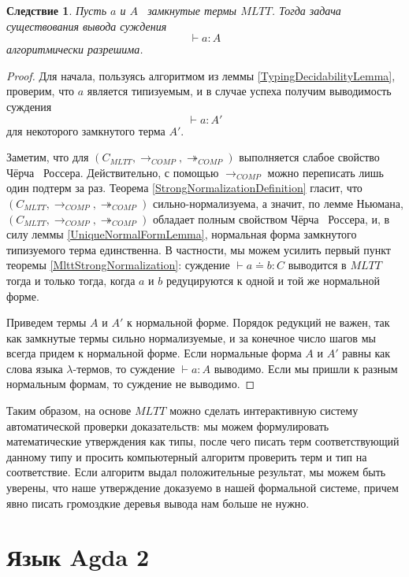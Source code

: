\documentclass{article}[12pt]
\newtheorem{corollary}{Следствие}
\newcommand{\dash}{\textemdash\ }
\begin{document}
\begin{corollary}
    Пусть $a$ и $A$ \dash замкнутые термы $MLTT$. Тогда задача существования вывода суждения
    $$\vdash a : A$$
    алгоритмически разрешима. 
\end{corollary}
\begin{proof}
    Для начала, пользуясь алгоритмом из леммы \ref{TypingDecidabilityLemma}, проверим, что $a$ является
    типизуемым, и в случае успеха получим выводимость суждения $$\vdash a : A'$$
    для некоторого замкнутого терма $A'$.

    Заметим, что для $(C_{MLTT}, \rightarrow_{COMP}, \twoheadrightarrow_{COMP})$ выполняется
    слабое свойство Чёрча \dash Россера. Действительно, с помощью $\rightarrow_{COMP}$ можно
    переписать лишь один подтерм за раз. Теорема \ref{StrongNormalizationDefinition} гласит,
    что $(C_{MLTT}, \rightarrow_{COMP}, \twoheadrightarrow_{COMP})$ сильно-нормализуема, а значит,
    по лемме Ньюмана, $(C_{MLTT}, \rightarrow_{COMP}, \twoheadrightarrow_{COMP})$ обладает полным
    свойством Чёрча \dash Россера, и, в силу леммы \ref{UniqueNormalFormLemma}, нормальная форма замкнутого
    типизуемого терма единственна. В частности, мы можем усилить первый пункт теоремы \ref{MlttStrongNormalization}:
    суждение $\vdash a \doteq b : C$ выводится в $MLTT$ тогда и только тогда, когда $a$ и $b$
    редуцируются к одной и той же нормальной форме.

    Приведем термы $A$ и $A'$ к нормальной форме. Порядок редукций не важен, так как замкнутые термы
    сильно нормализуемые, и за конечное число шагов мы всегда придем к нормальной форме. Если
    нормальные форма $A$ и $A'$ равны как слова языка $\lambda$-термов, то суждение
    $\vdash a : A$ выводимо. Если мы пришли к разным нормальным формам, то суждение не выводимо.
\end{proof}

Таким образом, на основе $MLTT$ можно сделать интерактивную систему автоматической проверки доказательств:
мы можем формулировать математические утверждения как типы, после чего писать терм соответствующий данному
типу и просить компьютерный алгоритм проверить терм и тип на соответствие. Если алгоритм выдал
положительные результат, мы можем быть уверены, что наше утверждение доказуемо в нашей формальной системе,
причем явно писать громоздкие деревья вывода нам больше не нужно.

\section{Язык Agda 2}
\end{document}

